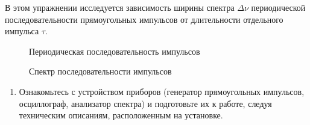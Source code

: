 \begin{lab:task}


%
%
%

В этом упражнении исследуется зависимость ширины спектра $\Delta \nu$
периодической последовательности прямоугольных импульсов
от длительности отдельного импульса $\tau$.

\begin{figure}[h!]
\hfil\hfil
\begin{minipage}{0.4\textwidth}
    \caption{Периодическая последовательность импульсов}
\end{minipage}
\hfil
\begin{minipage}{0.4\textwidth}
    \caption{Спектр последовательности импульсов}
\end{minipage}
\end{figure}

\begin{enumerate}

\item Ознакомьтесь с устройством приборов (генератор прямоугольных импульсов,
осциллограф, анализатор спектра) и подготовьте их к работе,
следуя техническим описаниям, расположенным на установке.


\end{enumerate}
\end{lab:task}
